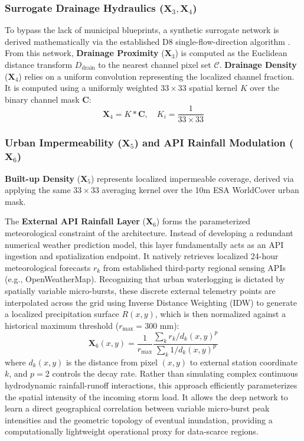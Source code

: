 \documentclass[conference]{IEEEtran}
\begin{document}
\subsubsection{Surrogate Drainage Hydraulics ($\mathbf{X}_3, \mathbf{X}_4$)}
To bypass the lack of municipal blueprints, a synthetic surrogate network is derived mathematically via the established D8 single-flow-direction algorithm \cite{16,21}.
From this network, \textbf{Drainage Proximity} ($\mathbf{X}_3$) is computed as the Euclidean distance transform $D_{\text{drain}}$ to the nearest channel pixel set $\mathcal{C}$.
\textbf{Drainage Density} ($\mathbf{X}_4$) relies on a uniform convolution representing the localized channel fraction. It is computed using a uniformly weighted $33 \times 33$ spatial kernel $K$ over the binary channel mask $\mathbf{C}$:
\begin{equation}
\mathbf{X}_4 = K * \mathbf{C}, \quad K_i = \frac{1}{33 \times 33}
\end{equation}

\subsubsection{Urban Impermeability ($\mathbf{X}_5$) and API Rainfall Modulation ($\mathbf{X}_6$)}
\textbf{Built-up Density} ($\mathbf{X}_5$) represents localized impermeable coverage, derived via applying the same $33 \times 33$ averaging kernel over the 10m ESA WorldCover urban mask.

The \textbf{External API Rainfall Layer} ($\mathbf{X}_6$) forms the parameterized meteorological constraint of the architecture. Instead of developing a redundant numerical weather prediction model, this layer fundamentally acts as an API ingestion and spatialization endpoint. It natively retrieves localized 24-hour meteorological forecasts $r_k$ from established third-party regional sensing APIs (e.g., OpenWeatherMap). Recognizing that urban waterlogging is dictated by spatially variable micro-bursts, these discrete external telemetry points are interpolated across the grid using Inverse Distance Weighting (IDW) to generate a localized precipitation surface $R(x,y)$, which is then normalized against a historical maximum threshold ($r_{\max} = 300\text{ mm}$):
\begin{equation}
\mathbf{X}_{6}(x,y) = \frac{1}{r_{\max}} \frac{\sum_{k} r_k / d_k(x,y)^p}{\sum_{k} 1 / d_k(x,y)^p}
\end{equation}
where $d_k(x,y)$ is the distance from pixel $(x,y)$ to external station coordinate $k$, and $p=2$ controls the decay rate. Rather than simulating complex continuous hydrodynamic rainfall-runoff interactions, this approach efficiently parameterizes the spatial intensity of the incoming storm load. It allows the deep network to learn a direct geographical correlation between variable micro-burst peak intensities and the geometric topology of eventual inundation, providing a computationally lightweight operational proxy for data-scarce regions.
\end{document}
